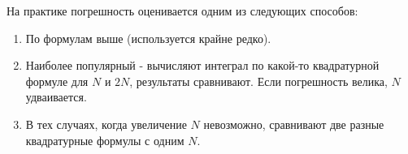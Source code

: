 \documentclass[a4paper,11pt]{article}
\begin{document}
  \begin{mainblock}
    На практике погрешность оценивается одним из следующих способов:
    \begin{enumerate}
      \item По формулам выше (используется крайне редко).
      \item Наиболее популярный - вычисляют интеграл по какой-то квадратурной формуле для $N$ и $2N$, результаты сравнивают. Если погрешность велика, $N$ удваивается.
      \item В тех случаях, когда увеличение $N$ невозможно, сравнивают две разные квадратурные формулы с одним $N$.
    \end{enumerate}
  \end{mainblock}
    
\end{document}
